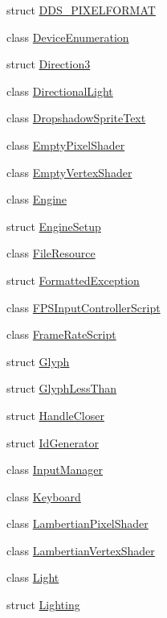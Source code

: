 \begin{DoxyCompactItemize}
struct \hyperlink{structmage_1_1_d_d_s___p_i_x_e_l_f_o_r_m_a_t}{D\+D\+S\+\_\+\+P\+I\+X\+E\+L\+F\+O\+R\+M\+AT}
\item 
class \hyperlink{classmage_1_1_device_enumeration}{Device\+Enumeration}
\item 
struct \hyperlink{structmage_1_1_direction3}{Direction3}
\item 
class \hyperlink{classmage_1_1_directional_light}{Directional\+Light}
\item 
class \hyperlink{classmage_1_1_dropshadow_sprite_text}{Dropshadow\+Sprite\+Text}
\item 
class \hyperlink{classmage_1_1_empty_pixel_shader}{Empty\+Pixel\+Shader}
\item 
class \hyperlink{classmage_1_1_empty_vertex_shader}{Empty\+Vertex\+Shader}
\item 
class \hyperlink{classmage_1_1_engine}{Engine}
\item 
struct \hyperlink{structmage_1_1_engine_setup}{Engine\+Setup}
\item 
class \hyperlink{classmage_1_1_file_resource}{File\+Resource}
\item 
struct \hyperlink{structmage_1_1_formatted_exception}{Formatted\+Exception}
\item 
class \hyperlink{classmage_1_1_f_p_s_input_controller_script}{F\+P\+S\+Input\+Controller\+Script}
\item 
class \hyperlink{classmage_1_1_frame_rate_script}{Frame\+Rate\+Script}
\item 
struct \hyperlink{structmage_1_1_glyph}{Glyph}
\item 
struct \hyperlink{structmage_1_1_glyph_less_than}{Glyph\+Less\+Than}
\item 
struct \hyperlink{structmage_1_1_handle_closer}{Handle\+Closer}
\item 
struct \hyperlink{structmage_1_1_id_generator}{Id\+Generator}
\item 
class \hyperlink{classmage_1_1_input_manager}{Input\+Manager}
\item 
class \hyperlink{classmage_1_1_keyboard}{Keyboard}
\item 
class \hyperlink{classmage_1_1_lambertian_pixel_shader}{Lambertian\+Pixel\+Shader}
\item 
class \hyperlink{classmage_1_1_lambertian_vertex_shader}{Lambertian\+Vertex\+Shader}
\item 
class \hyperlink{classmage_1_1_light}{Light}
\item 
struct \hyperlink{structmage_1_1_lighting}{Lighting}

\end{DoxyCompactItemize}
